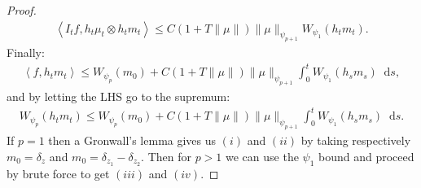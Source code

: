 \documentclass[11pt,a4paper]{article}
\newcommand{\brac}[1]{\left\langle#1\right\rangle}
\newcommand{\dd}{\mathop{}\!\mathrm{d}}
\begin{document}
\begin{proof}
    \begin{align*}
        \brac{I_tf,h_t\mu_t \otimes h_t m_t} \leq C(1 + T\|\mu\|)\|\mu\|_{\psi_{p+1}} W_{\psi_1}(h_tm_t).
    \end{align*}
    Finally:
    \begin{align*}
        \brac{f,h_tm_t} \leq W_{\psi_p}(m_0) + C(1 + T\|\mu\|)\|\mu\|_{\psi_{p+1}}\int_0^t  W_{\psi_1}(h_sm_s)\dd s,
    \end{align*}
    and by letting the LHS go to the supremum:
    \begin{align*}
        W_{\psi_p}(h_tm_t) \leq W_{\psi_p}(m_0) + C(1 + T\|\mu\|)\|\mu\|_{\psi_{p+1}}\int_0^t  W_{\psi_1}(h_sm_s)\dd s.
    \end{align*}
    If $p = 1$ then a Gronwall's lemma gives us $(i)$ and $(ii)$ by taking respectively $m_0 = \delta_z$ and $m_0 = \delta_{z_1} -\delta_{z_2}$. Then for $p > 1$ we can use the $\psi_1$ bound and proceed by brute force to get $(iii)$ and $(iv)$.
\end{proof}
\end{document}
